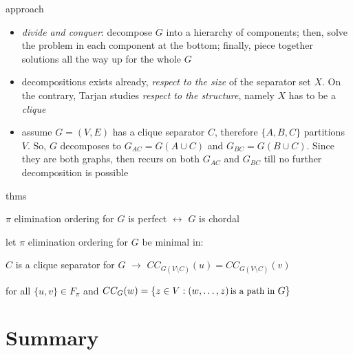 \documentclass{beamer}
\begin{document}
\begin{frame}{approach}
\begin{itemize}
    \item \textit{divide and conquer}: decompose $G$ into a hierarchy of
    components; then, solve the problem in each component at the bottom;
    finally, piece together solutions all the way up for the whole $G$
    \item decompositions exists already, \textit{respect to the size} of the
    separator set $X$.  On the contrary, Tarjan studies \textit{respect to the
    structure}, namely $X$ has to be a \textit{clique}
    \item assume $G=(V, E)$ has a clique separator $C$, therefore $ \lbrace A,
    B, C \rbrace$ partitions $V$. So, $G$ decomposes to $G_{AC}=G(A\cup C)$ and
    $G_{BC}=G(B\cup C)$. Since they are both graphs, then recurs on both $G_{AC}$
    and $G_{BC}$ till no further decomposition is possible
\end{itemize}
\end{frame}

\begin{frame}{thms}
\begin{theorem}
$\pi$ elimination ordering for $G$ is perfect $\leftrightarrow$ $G$ is chordal
\end{theorem}
\begin{theorem}
let $\pi$ elimination ordering for $G$ be minimal in: 
\begin{center}
$C$ is a clique separator for $G$ $\rightarrow$ $CC_{G(V\setminus C)}(u) =
CC_{G(V\setminus C)}(v)$
\end{center}

for all $ \lbrace u, v \rbrace \in F_{\pi}$ and $CC_{G}(w)= \lbrace z\in V:
    (w,\ldots,z) \text{\small\,is a path in } G \rbrace$
\end{theorem}
\end{frame}


\section*{Summary}
\end{document}

